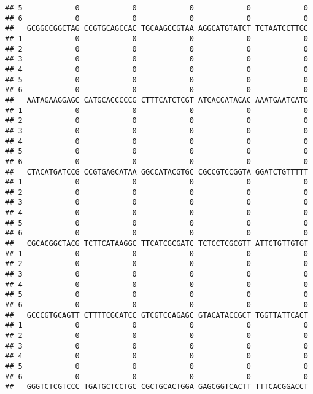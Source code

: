 \documentclass[]{article}
\begin{document}
\begin{verbatim}
## 5            0            0            0            0            0
## 6            0            0            0            0            0
##   GCGGCCGGCTAG CCGTGCAGCCAC TGCAAGCCGTAA AGGCATGTATCT TCTAATCCTTGC
## 1            0            0            0            0            0
## 2            0            0            0            0            0
## 3            0            0            0            0            0
## 4            0            0            0            0            0
## 5            0            0            0            0            0
## 6            0            0            0            0            0
##   AATAGAAGGAGC CATGCACCCCCG CTTTCATCTCGT ATCACCATACAC AAATGAATCATG
## 1            0            0            0            0            0
## 2            0            0            0            0            0
## 3            0            0            0            0            0
## 4            0            0            0            0            0
## 5            0            0            0            0            0
## 6            0            0            0            0            0
##   CTACATGATCCG CCGTGAGCATAA GGCCATACGTGC CGCCGTCCGGTA GGATCTGTTTTT
## 1            0            0            0            0            0
## 2            0            0            0            0            0
## 3            0            0            0            0            0
## 4            0            0            0            0            0
## 5            0            0            0            0            0
## 6            0            0            0            0            0
##   CGCACGGCTACG TCTTCATAAGGC TTCATCGCGATC TCTCCTCGCGTT ATTCTGTTGTGT
## 1            0            0            0            0            0
## 2            0            0            0            0            0
## 3            0            0            0            0            0
## 4            0            0            0            0            0
## 5            0            0            0            0            0
## 6            0            0            0            0            0
##   GCCCGTGCAGTT CTTTTCGCATCC GTCGTCCAGAGC GTACATACCGCT TGGTTATTCACT
## 1            0            0            0            0            0
## 2            0            0            0            0            0
## 3            0            0            0            0            0
## 4            0            0            0            0            0
## 5            0            0            0            0            0
## 6            0            0            0            0            0
##   GGGTCTCGTCCC TGATGCTCCTGC CGCTGCACTGGA GAGCGGTCACTT TTTCACGGACCT

\end{verbatim}
\end{document}
